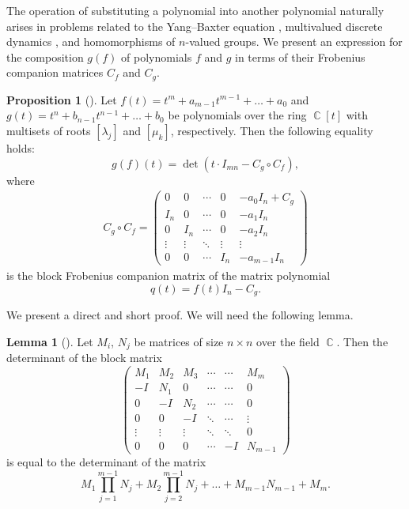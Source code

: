 \documentclass[14pt, dvipsnames]{extarticle}
\theoremstyle{definition}
\newtheorem{lemma}{Lemma}
\newtheorem{prop}{Proposition}
\theoremstyle{definition}
\theoremstyle{remark}
\DeclareMathOperator{\Cc}{\mathbb{C}}
\begin{document}
The operation of substituting a polynomial into another polynomial naturally arises in problems related to the Yang–Baxter equation \cite{Krichever81}, multivalued discrete dynamics \cite{Veselov91}, and homomorphisms of $n$-valued groups. We present an expression for the composition $g(f)$ of polynomials $f$ and $g$ in terms of their Frobenius companion matrices $C_f$ and $C_g$.

\begin{prop}[\cite{Carrillo}]\label{C_g_circ_C_f}
Let $f(t) = t^m + a_{m-1}t^{m-1} + \dots + a_0$ and $g(t) = t^n + b_{n-1}t^{n-1} + \dots + b_0$ be polynomials over the ring $\Cc[t]$ with multisets of roots $[\lambda_j]$ and $[\mu_k]$, respectively. Then the following equality holds:
$$g(f)(t) = \det(t\cdot I_{mn} - C_g\circ C_f),$$
where
$$\begin{aligned}
C_g\circ C_f = \left(\begin{array}{ccccc}
0 & 0 & \cdots & 0 & -a_{0}I_{n}+C_{g}\\
I_{n} & 0 & \cdots & 0 & -a_{1}I_{n}\\
0 & I_{n} & \cdots & 0 & -a_{2}I_{n}\\
\vdots & \vdots & \ddots & \vdots & \vdots\\
0 & 0 & \cdots & I_{n} & -a_{m-1}I_{n}
\end{array}\right)
\end{aligned}$$
is the block Frobenius companion matrix of the matrix polynomial
$$q(t) = f(t)I_n - C_g.$$
\end{prop}

We present a direct and short proof. We will need the following lemma.

\begin{lemma}[\cite{Melman}]\label{lemma_blocks}
Let $M_i$, $N_j$ be matrices of size $n\times n$ over the field $\Cc$. Then the determinant of the block matrix
$$\left(\begin{array}{cccccc}
M_{1} & M_{2} & M_{3} & \cdots & \cdots & M_{m}\\
-I & N_{1} & 0 & \cdots & \cdots & 0\\
0 & -I & N_{2} & \cdots & \cdots & 0\\
0 & 0 & -I & \ddots & \cdots & \vdots\\
\vdots & \vdots & \vdots & \ddots & \ddots & 0\\
0 & 0 & 0 & \cdots & -I & N_{m-1}
\end{array}\right)$$
is equal to the determinant of the matrix
$$M_{1}\prod\limits_{j=1}^{m-1}N_{j}+M_{2}\prod\limits_{j=2}^{m-1}N_{j}+\dots+M_{m-1}N_{m-1}+M_{m}.$$
\end{lemma}
\end{document}
